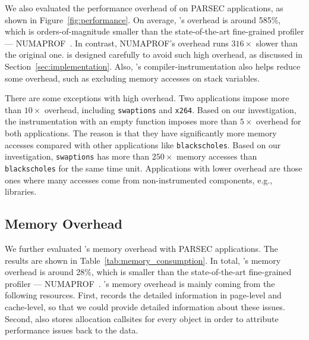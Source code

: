 We also evaluated the performance overhead of \NP{} on PARSEC applications, as shown in Figure~\ref{fig:performance}. On average, \NP{}'s overhead is around 585\%, which is orders-of-magnitude smaller than the state-of-the-art fine-grained profiler --- NUMAPROF~\cite{valat:2018:numaprof}. In contrast, NUMAPROF's overhead runs $316\times$ slower than the original one. \NP{} is designed carefully to avoid such high overhead, as discussed in Section~\ref{sec:implementation}. Also, \NP{}'s compiler-instrumentation also helps reduce some overhead, such as excluding memory accesses on stack variables. 

There are some exceptions with high overhead. Two applications impose more than $10\times$ overhead, including \texttt{swaptions} and \texttt{x264}. Based on our investigation, the instrumentation with an empty function imposes more than $5\times$ overhead for both applications. The reason is that they have significantly more  memory accesses compared with other applications like \texttt{blackscholes}. Based on our investigation, \texttt{swaptions} has more than $250\times$ memory accesses than \texttt{blackscholes} for the same time unit. Applications with lower overhead are those ones where many accesses come from non-instrumented components, e.g., libraries. 


\subsection{Memory Overhead}
\label{sec:memory}


We further evaluated \NP{}'s memory overhead with PARSEC applications. The results are shown in Table~\ref{tab:memory_consumption}. In total, \NP{}'s memory overhead is around 28\%, which is  smaller than the state-of-the-art fine-grained profiler --- NUMAPROF~\cite{valat:2018:numaprof}. \NP{}'s memory overhead is mainly coming from the following resources. First, \NP{} records the detailed information in page-level and cache-level, so that we could provide detailed information about these issues. Second, \NP{} also stores allocation callsites for every object in order to attribute performance issues back to the data. 

